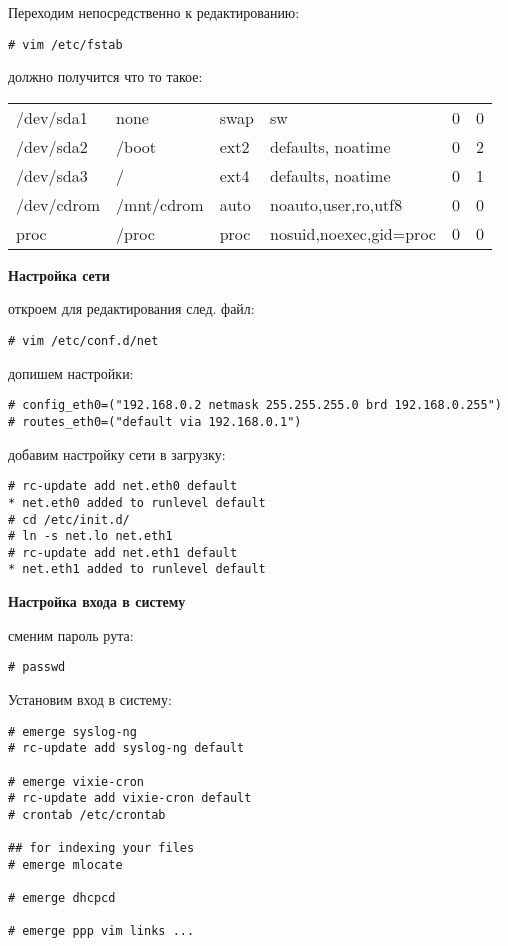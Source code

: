 \documentclass[12pt, a4paper]{article}
\begin{document}
Переходим непосредственно к редактированию:

\begin{verbatim}
# vim /etc/fstab
\end{verbatim}

должно получится что то такое:
\newline

\begin{tabular}{llllcc}
/dev/sda1 & none & swap & sw & 0 & 0 \\
/dev/sda2 & /boot & ext2 & defaults, noatime & 0 & 2\\
/dev/sda3 & / & ext4 & defaults, noatime & 0 & 1 \\
/dev/cdrom& /mnt/cdrom & auto & noauto,user,ro,utf8 & 0 & 0 \\
proc & /proc & proc & nosuid,noexec,gid=proc & 0 & 0 \\
\end{tabular}

{\bf Настройка сети}

откроем для редактирования след. файл:

\begin{verbatim}
# vim /etc/conf.d/net
\end{verbatim}

допишем настройки:

\begin{verbatim}
# config_eth0=("192.168.0.2 netmask 255.255.255.0 brd 192.168.0.255")
# routes_eth0=("default via 192.168.0.1")
\end{verbatim}

добавим настройку сети в загрузку:

\begin{verbatim}
# rc-update add net.eth0 default
* net.eth0 added to runlevel default
# cd /etc/init.d/
# ln -s net.lo net.eth1
# rc-update add net.eth1 default
* net.eth1 added to runlevel default
\end{verbatim}


{\bf Настройка входа в систему}

сменим пароль рута:

\begin{verbatim}
# passwd
\end{verbatim}

Установим вход в систему:

\begin{verbatim}
# emerge syslog-ng
# rc-update add syslog-ng default

# emerge vixie-cron
# rc-update add vixie-cron default
# crontab /etc/crontab

## for indexing your files
# emerge mlocate

# emerge dhcpcd

# emerge ppp vim links ...
\end{verbatim}
\end{document}
